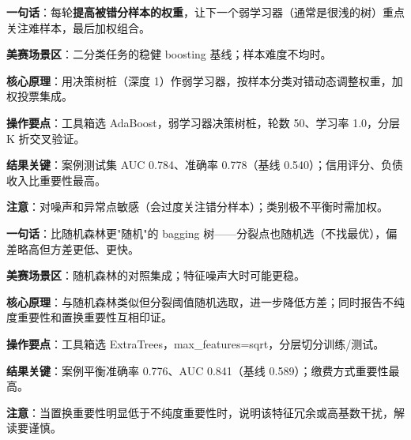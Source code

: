 
\begin{algobrief}
\textbf{一句话}：每轮\textbf{提高被错分样本的权重}，让下一个弱学习器（通常是很浅的树）重点关注难样本，最后加权组合。

\textbf{美赛场景区}：二分类任务的稳健 boosting 基线；样本难度不均时。

\textbf{核心原理}：用决策树桩（深度 1）作弱学习器，按样本分类对错动态调整权重，加权投票集成。

\textbf{操作要点}：工具箱选 AdaBoost，弱学习器决策树桩，轮数 50、学习率 1.0，分层 K 折交叉验证。

\textbf{结果关键}：案例测试集 AUC 0.784、准确率 0.778（基线 0.540）；信用评分、负债收入比重要性最高。

\textbf{注意}：对噪声和异常点敏感（会过度关注错分样本）；类别极不平衡时需加权。
\end{algobrief}


\begin{algobrief}
\textbf{一句话}：比随机森林更"随机"的 bagging 树——分裂点也随机选（不找最优），偏差略高但方差更低、更快。

\textbf{美赛场景区}：随机森林的对照集成；特征噪声大时可能更稳。

\textbf{核心原理}：与随机森林类似但分裂阈值随机选取，进一步降低方差；同时报告不纯度重要性和置换重要性互相印证。

\textbf{操作要点}：工具箱选 ExtraTrees，max\_features=sqrt，分层切分训练/测试。

\textbf{结果关键}：案例平衡准确率 0.776、AUC 0.841（基线 0.589）；缴费方式重要性最高。

\textbf{注意}：当置换重要性明显低于不纯度重要性时，说明该特征冗余或高基数干扰，解读要谨慎。
\end{algobrief}


